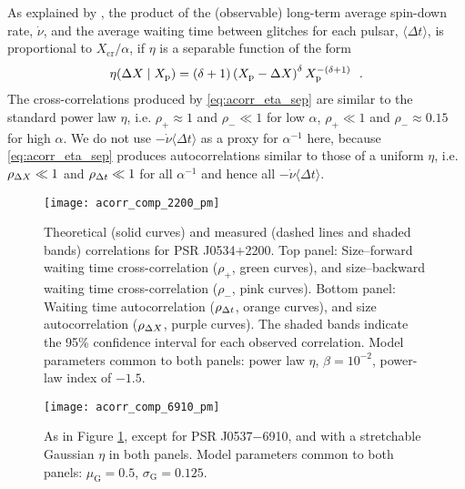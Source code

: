 As explained by \citet{Melatos2018}, the product of the (observable) long-term average spin-down rate, $\dot{\nu}$, and the average waiting time between glitches for each pulsar, $\langle \Delta t \rangle$, is proportional to $X_\textrm{cr} / \alpha$, if $\eta$ is a separable function of the form
\begin{equation}
	\label{eq:acorr_eta_sep}
	{\eta(\Delta X \mid X_{\textrm{p}}) = (\delta + 1)\left( X_{\textrm{p}}- \Delta X \right)^\delta X_{\textrm{p}}^{-(\delta+1)}}\ \ .
\end{equation}
The cross-correlations produced by \eqref{eq:acorr_eta_sep} are similar to the standard power law $\eta$, i.e. $\rho_+ \approx 1$ and $\rho_- \ll 1$ for low $\alpha$, $\rho_+ \ll 1$ and $\rho_- \approx 0.15$ for high $\alpha$. We do not use $- \dot{\nu} \langle \Delta t \rangle$ as a proxy for $\alpha^{-1}$ here, because \eqref{eq:acorr_eta_sep} produces autocorrelations similar to those of a uniform $\eta$, i.e. $\rho_{\Delta X} \ll 1$ and $\rho_{\Delta t} \ll 1$ for all $\alpha^{-1}$ and hence all $- \dot{\nu} \langle \Delta t \rangle$.
 
\begin{figure}
	\centering
	\texttt{[image: acorr\_comp\_2200\_pm]}
	\caption{Theoretical (solid curves) and measured (dashed lines and shaded bands) correlations for PSR J0534$+$2200. Top panel: Size--forward waiting time cross-correlation ($\rho_+$, green curves), and size--backward waiting time cross-correlation ($\rho_-$, pink curves). Bottom panel: Waiting time autocorrelation ($\rho_{\Delta t}$, orange curves), and size autocorrelation ($\rho_{\Delta X}$, purple curves). The shaded bands indicate the 95\% confidence interval for each observed correlation. Model parameters common to both panels: power law $\eta$, $\beta=10^{-2}$, power-law index of $-1.5$.}
	\label{fig:acorr_comp_2200}
\end{figure}

\begin{figure}
	\centering
	\texttt{[image: acorr\_comp\_6910\_pm]}
	\caption{As in Figure \ref{fig:acorr_comp_2200}, except for PSR J0537$-$6910, and with a stretchable Gaussian $\eta$ in both panels. Model parameters common to both panels: $\mu_\textrm{G}=0.5$, $\sigma_\textrm{G}=0.125$.}
	\label{fig:acorr_comp_6910}
\end{figure}

